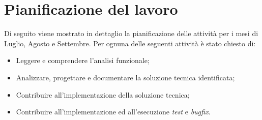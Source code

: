 \section{Pianificazione del lavoro}
\label{cap:pianificazione}
Di seguito viene mostrato in dettaglio la pianificazione delle attività per i mesi di Luglio, Agosto e Settembre.
Per ognuna delle seguenti attività è stato chiesto di:
\begin{itemize}
	\item Leggere e comprendere l’analisi funzionale;
	\item Analizzare, progettare e documentare la soluzione tecnica identificata;
	\item Contribuire all’implementazione della soluzione tecnica;
	\item Contribuire all’implementazione ed all’esecuzione \emph{test} e \emph{bugfix}.
\end{itemize}

